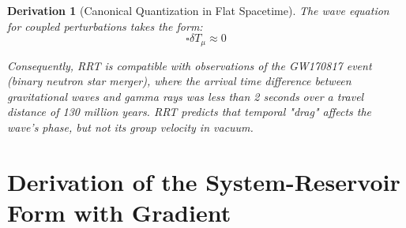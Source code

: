 \documentclass[10pt, a4paper]{article}
\newtheorem{derivation}{Derivation}
\begin{document}
\begin{derivation}[Canonical Quantization in Flat Spacetime]
The wave equation for coupled perturbations takes the form:
\begin{equation}
\square \delta T_\mu \approx 0
\tag{7.8}
\end{equation}

Consequently, RRT is compatible with observations of the GW170817 event (binary neutron star merger), where the arrival time difference between gravitational waves and gamma rays was less than 2 seconds over a travel distance of 130 million years. RRT predicts that temporal "drag" affects the wave's phase, but not its group velocity in vacuum.
\end{derivation}

\section{Derivation of the System-Reservoir Form with Gradient}
\end{document}
